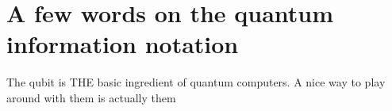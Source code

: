 \section{A few words on the quantum information notation}

The qubit is THE basic ingredient of quantum computers. A nice way to play around with them is actually them